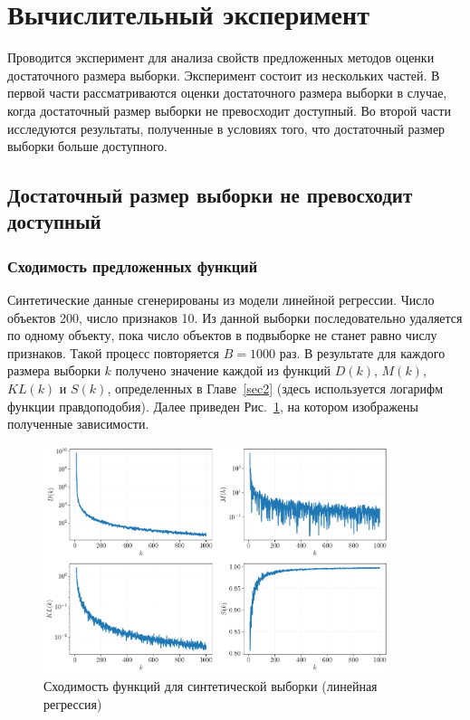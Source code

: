 \section{Вычислительный эксперимент}\label{sec4}

Проводится эксперимент для анализа свойств предложенных методов оценки достаточного размера выборки. Эксперимент состоит из нескольких частей. В первой части рассматриваются оценки достаточного размера выборки в случае, когда достаточный размер выборки не превосходит доступный. Во второй части исследуются результаты, полученные в условиях того, что достаточный размер выборки больше доступного.

\subsection{Достаточный размер выборки не превосходит доступный}

\subsubsection{Сходимость предложенных функций}

Синтетические данные сгенерированы из модели линейной регрессии. Число объектов 200, число признаков 10. Из данной выборки последовательно удаляется по одному объекту, пока число объектов в подвыборке не станет равно числу признаков. Такой процесс повторяется $B=1000$ раз. В результате для каждого размера выборки $k$ получено значение каждой из функций $D(k)$, $M(k)$, $KL(k)$ и $S(k)$, определенных в Главе~\ref{sec2} (здесь используется логарифм функции правдоподобия). Далее приведен Рис.~\ref{synthetic-regression-functions}, на котором изображены полученные зависимости.

\begin{figure}[h!]
    \centering
    \includegraphics[width=0.9\textwidth]{figures/synthetic-regression-functions.pdf}
    \caption{Сходимость функций для синтетической выборки (линейная регрессия)}
    \label{synthetic-regression-functions}
\end{figure}

